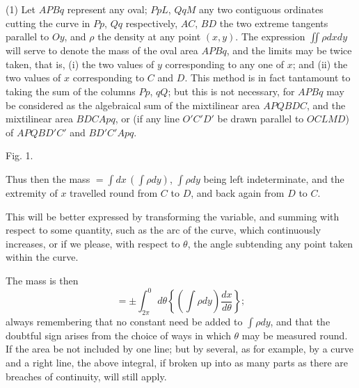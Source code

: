 \documentclass[11pt]{article}
\newcommand{\sourcepage}[1]{\marginpar{\scriptsize p.~#1}}
\begin{document}
(1) Let $APBq$ represent any oval; $PpL$, $QqM$ any two contiguous ordinates cutting the curve in $Pp$, $Qq$ respectively, $AC$, $BD$ the two extreme tangents parallel to $Oy$, and $\rho$ the density at any point $(x,y)$. The expression $\iint\rho dxdy$ will serve to denote the mass of the oval area $APBq$, and the limits may be twice taken, that is, (i) the two values of $y$ corresponding to any one of $x$; and (ii) the two values of $x$ corresponding to $C$ and $D$. This method is in fact tantamount to taking the sum of the columns $Pp$, $qQ$; but this is not necessary, for $APBq$ may be considered as the algebraical sum of the mixtilinear area $APQBDC$, and the mixtilinear area $BDCApq$, or (if any line $O'C'D'$ be drawn parallel to $OCLMD$) of $APQBD'C'$ and $BD'C'Apq$.

\begin{center}
\par\small Fig. 1.
\end{center}

Thus then the mass $=\int dx\,(\int\rho dy)$, $\int\rho dy$ being left indeterminate, and the extremity of $x$ travelled round from $C$ to $D$, and back again from $D$ to $C$.

\sourcepage{37}
This will be better expressed by transforming the variable, and summing with respect to some quantity, such as the arc of the curve, which continuously increases, or if we please, with respect to $\theta$, the angle subtending any point taken within the curve.

The mass is then
\[
=\pm\int_{2\pi}^{0} d\theta\left\{\left(\int\rho dy\right)\frac{dx}{d\theta}\right\};
\]
always remembering that no constant need be added to $\int\rho dy$, and that the doubtful sign arises from the choice of ways in which $\theta$ may be measured round. If the area be not included by one line; but by several, as for example, by a curve and a right line, the above integral, if broken up into as many parts as there are breaches of continuity, will still apply.
\end{document}
